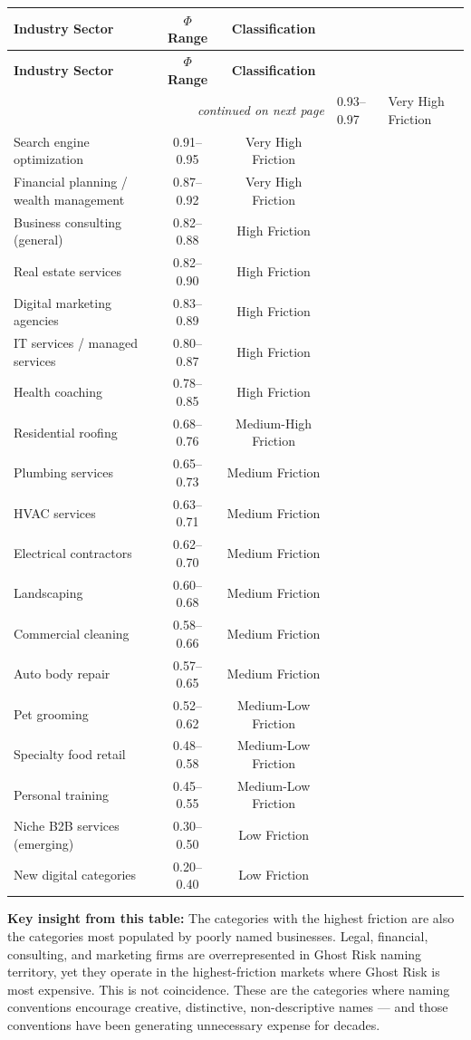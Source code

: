 \documentclass[12pt, openany]{book}
\theoremstyle{thmstyle}
\theoremstyle{defstyle}
\begin{document}
\begin{center}
\begin{longtable}{lcc}
\toprule
\textbf{Industry Sector} & \textbf{$\Phi$ Range} & \textbf{Classification} \\
\midrule
\endfirsthead
\toprule
\textbf{Industry Sector} & \textbf{$\Phi$ Range} & \textbf{Classification} \\
\midrule
\endhead
\midrule
\multicolumn{3}{r}{\small\textit{continued on next page}}
\endfoot
\bottomrule
\endlastfoot
Personal injury law & 0.93--0.97 & Very High Friction \\
Search engine optimization & 0.91--0.95 & Very High Friction \\
Financial planning / wealth management & 0.87--0.92 & Very High Friction \\
Business consulting (general) & 0.82--0.88 & High Friction \\
Real estate services & 0.82--0.90 & High Friction \\
Digital marketing agencies & 0.83--0.89 & High Friction \\
IT services / managed services & 0.80--0.87 & High Friction \\
Health coaching & 0.78--0.85 & High Friction \\
Residential roofing & 0.68--0.76 & Medium-High Friction \\
Plumbing services & 0.65--0.73 & Medium Friction \\
HVAC services & 0.63--0.71 & Medium Friction \\
Electrical contractors & 0.62--0.70 & Medium Friction \\
Landscaping & 0.60--0.68 & Medium Friction \\
Commercial cleaning & 0.58--0.66 & Medium Friction \\
Auto body repair & 0.57--0.65 & Medium Friction \\
Pet grooming & 0.52--0.62 & Medium-Low Friction \\
Specialty food retail & 0.48--0.58 & Medium-Low Friction \\
Personal training & 0.45--0.55 & Medium-Low Friction \\
Niche B2B services (emerging) & 0.30--0.50 & Low Friction \\
New digital categories & 0.20--0.40 & Low Friction \\
\end{longtable}
\end{center}

\textbf{Key insight from this table:} The categories with the highest friction are also the categories most populated by poorly named businesses. Legal, financial, consulting, and marketing firms are overrepresented in Ghost Risk naming territory, yet they operate in the highest-friction markets where Ghost Risk is most expensive. This is not coincidence. These are the categories where naming conventions encourage creative, distinctive, non-descriptive names --- and those conventions have been generating unnecessary expense for decades.
\end{document}
